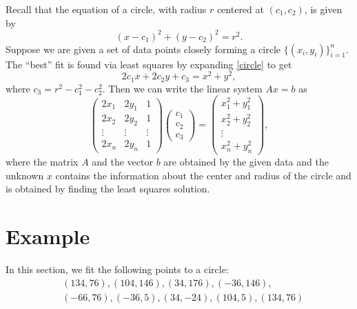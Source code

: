 Recall that the equation of a circle, with radius $r$ centered at $(c_1,c_2)$, is given by
\begin{equation}
\label{circle}
(x-c_1)^2 + (y-c_2)^2 = r^2.
\end{equation}
Suppose we are given a set of data points closely forming a circle $\{(x_i,y_i)\}^n_{i=1}$.  The ``best'' fit is found via least squares by expanding \eqref{circle} to get
\[
2 c_1 x + 2 c_2 y + c_3 = x^2 + y^2,
\]
where $c_3 = r^2 - c_1^2 - c_2^2$.  Then we can write the linear system $A x = b$ as
\[
\begin{pmatrix}
2 x_1 & 2 y_1 & 1\\
2 x_2 & 2 y_2 & 1\\
\vdots & \vdots & \vdots \\
2 x_n & 2 y_n & 1
\end{pmatrix}
\begin{pmatrix}
c_1\\
c_2\\
c_3
\end{pmatrix}=
\begin{pmatrix}
x_1^2 + y_1^2\\
x_2^2 + y_2^2\\
\vdots\\
x_n^2 + y_n^2
\end{pmatrix},
\]
where the matrix $A$ and the vector $b$ are obtained by the given data and the unknown $x$ contains the information about the center and radius of the circle and is obtained by finding the least squares solution.

\section*{Example}

In this section, we fit the following points to a circle:
\begin{align*}
&(134,76),(104,146),(34,176),(-36,146),\\
&(-66,76),(-36,5),(34,-24),(104,5),(134,76)
\end{align*}

